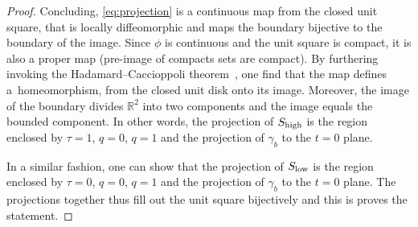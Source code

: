 \documentclass[10pt,a4paper]{amsart}
\numberwithin{equation}{section}
\begin{document}
\begin{proof}
 Concluding, \eqref{eq:projection} is a continuous map from the closed unit square, that is locally diffeomorphic and maps the boundary bijective to the boundary of the image. Since $\phi$ is continuous and the unit square is compact, it is also a proper map (pre-image of compacts sets are compact). By furthering invoking the Hadamard--Caccioppoli theorem~\cite{KrantzParks}, one find that the map defines a~homeomorphism, from the closed unit disk onto its image. Moreover, the image of the boundary divides $\mathbb R^2$ into two components and the image equals the bounded component. In other words, the projection of $S_{{\rm high}}$ is the region enclosed by $\tau=1$, $q=0$, $q=1$ and the projection of $\gamma_b$ to the $t=0$ plane.

 In a similar fashion, one can show that the projection of $S_{{\rm low}}$ is the region enclosed by $\tau=0$, $q=0$, $q=1$ and the projection of $\gamma_b$ to the $t=0$ plane. The projections together thus fill out the unit square bijectively and this is proves the statement.
 \end{proof}
\end{document}

